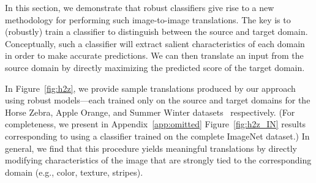 \documentclass{article}
\newcommand{\HtoZ}{Horse  Zebra}
\newcommand{\StoW}{Summer  Winter}
\newcommand{\AtoO}{Apple  Orange}
\begin{document}
{In this section, we demonstrate that robust classifiers give rise to a new methodology
for performing such image-to-image translations.
The key is  to (robustly) train a classifier to distinguish between
the source and target domain.
Conceptually, such a classifier will extract salient characteristics of each
domain in order to make accurate predictions.
We can then translate an input from the source domain by
directly maximizing the predicted score of the target domain.

In Figure~\ref{fig:h2z}, we provide sample translations produced by our 
approach using robust models---each trained only on the source and 
target domains for the {\HtoZ}, {\AtoO}, and {\StoW} 
datasets~\cite{zhu2017unpaired} respectively. (For completeness,
we present in Appendix~\ref{app:omitted} Figure~\ref{fig:h2z_IN} 
results corresponding to using
a classifier trained on the complete ImageNet dataset.)
In general, we find that this procedure yields meaningful
translations by directly modifying characteristics of the image 
that are strongly tied to the corresponding domain (e.g., color, 
texture, stripes).

\begin{figure}[htp]
    \begin{center}
\end{center}
\end{figure}}
\end{document}
